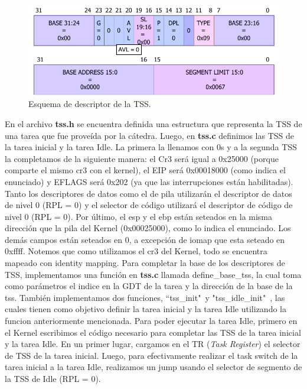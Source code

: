 \documentclass[a4paper]{article}
\begin{document}
\begin{figure}[h]
	\centering
	\includegraphics[scale=0.7]{img/TssdescriptorManual.pdf}
	\caption{Esquema de descriptor de la TSS.}
\end{figure}

\justify
En el archivo \textbf{tss.h} se encuentra definida una estructura que representa la TSS de una tarea que fue proveída por la cátedra. Luego, en \textbf{tss.c} definimos las TSS de la tarea inicial y la tarea Idle. La primera la llenamos con 0s y a la segunda TSS la completamos de la siguiente manera: el Cr3 será igual a 0x25000 (porque comparte el mismo cr3 con el kernel), el EIP será 0x00018000 (como indica el enunciado) y EFLAGS será 0x202 (ya que las interrupciones están habilitadas). Tanto los descriptores de datos como el de pila utilizarán el descriptor de datos de nivel 0 (RPL = 0) y el selector de código utilizará el descriptor de código de nivel 0 (RPL = 0). Por último, el esp y el ebp están seteados en la misma dirección que la pila del Kernel (0x00025000), como lo indica el enunciado. Los demás campos están seteados en 0, a excepción de iomap que esta seteado en 0xffff. Notemos que como utilizamos el cr3 del Kernel, todo se encuentra mapeado con identity mapping.
\justify
Para completar la base de los descriptores de TSS, implementamos una función en \textbf{tss.c} llamada define_base_tss, la cual toma como parámetros el indice en la GDT de la tarea y la dirección de la base de la tss. También implementamos dos funciones, ``tss_init"\ y "tss_idle_init"\ , las cuales tienen como objetivo definir la tarea inicial y la tarea Idle utilizando la funcion anteriormente mencionada.
\justify
Para poder ejecutar la tarea Idle, primero en el Kernel escribimos el código necesario para completar las TSS de la tarea inicial y la tarea Idle. En un primer lugar, cargamos en el TR (\textit{Task Register}) el selector de TSS de la tarea inicial. Luego, para efectivamente realizar el task switch de la tarea inicial a la tarea Idle, realizamos un jump usando el selector de segmento de la TSS de Idle (RPL = 0).
\justify
\end{document}
